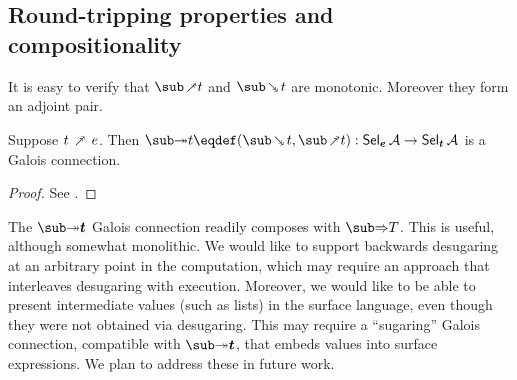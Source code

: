 \subsection{Round-tripping properties and compositionality}

It is easy to verify that $\desugarFwdF{t}$ and $\desugarBwdF{t}$ are monotonic. Moreover they form an adjoint pair.

\begin{theorem}
  \label{thm:surface-language:desugar:gc}
     Suppose $t \desugarFwdR e$. Then ${\desugarGC{t}} \eqdef (\desugarBwdF{t}, \desugarFwdF{t}): \Sel{\raw{e}}{A} \to \Sel{\raw{t}}{A}$ is a Galois connection.
\end{theorem}

\begin{proof}
   \ifappendices See . \else \ProofInSupplementaryMaterial \fi
\end{proof}

\noindent The $\desugarGC{\raw{t}}$ Galois connection readily composes with $\evalGC{T}$. This is useful, although somewhat monolithic. We would like to support backwards desugaring at an arbitrary point in the computation, which may require an approach that interleaves desugaring with execution. Moreover, we would like to be able to present intermediate values (such as lists) in the surface language, even though they were not obtained via desugaring. This may require a ``sugaring'' Galois connection, compatible with $\desugarGC{\raw{t}}$, that embeds values into surface expressions. We plan to address these in future work.
